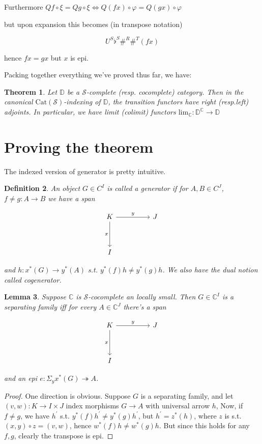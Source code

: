 \documentclass[10pt, oneside]{article}
\newtheorem{theorem}{Theorem}[section]
\newtheorem{definition}[theorem]{Definition}
\newtheorem{lemma}[theorem]{Lemma}
\begin{document}
Furthermore $Q f \circ \xi = Q g \circ \xi \iff Q (f x) \circ \varphi = Q (g x) \circ \varphi$

\noindent but upon expansion this becomes (in transpose notation)

$$U^S \flat^S \#^R \#^T (fx)$$

\noindent hence $fx = gx$ but $x$ is epi.

Packing together everything we've proved thus far, we have:

\begin{theorem}
    Let $\mathbb{D}$ be a $\mathcal{S}$-complete (resp. cocomplete) category. Then in the canonical $\mathrm{Cat}{(\mathcal{S})}$-indexing of $\mathbb{D}$, the transition functors have right (resp.left) adjoints. In particular, we have limit (colimit) functors $\mathrm{lim}_{\mathbb{C}}: \mathbb{D}^\mathbb{C} \to \mathbb{D}$
\end{theorem}

\section{Proving the theorem}

The indexed version of generator is pretty intuitive.
\begin{definition}
    An object $G \in C^I$ is called a generator if for $A, B \in C^J$, $f \neq g: A \to B$ we have a span

    \[\begin{tikzcd}
	K && J \\
	\\
	I
	\arrow["x"', from=1-1, to=3-1]
	\arrow["y", from=1-1, to=1-3]
    \end{tikzcd}\]
    
    \noindent and $h: x^\ast(G) \to y^\ast(A)$ s.t. $y^\ast(f) h \neq y^\ast(g) h$. We also have the dual notion called cogenerator.
    
\end{definition}

\begin{lemma}\label{thm:generator-epi-map}
    Suppose $\mathbb{C}$ is $\mathcal{S}$-cocomplete an locally small. Then $G \in \mathbb{C}^I$ is a separating family iff for every $A \in \mathbb{C}^J$ there's a span 

    
    \[\begin{tikzcd}
	K && J \\
	\\
	I
	\arrow["x"', from=1-1, to=3-1]
	\arrow["y", from=1-1, to=1-3]
    \end{tikzcd}\]

    \noindent and an epi $e: \Sigma_y x^\ast  (G) \twoheadrightarrow A$.
\end{lemma}
\begin{proof}
    One direction is obvious. Suppose $G$ is a separating family, and let $(v, w): K \to I \times J$ index morphisms $G \to A$ with universal arrow $h$, Now, if $f \neq g$, we have $h^\prime$ s.t. $y^\ast (f) h^\prime \neq y^\ast (g) h^\prime$, but $h^\prime = z^\ast (h)$, where $z$ is s.t. $(x,y) \circ z = (v, w)$, hence $w^\ast (f) h \neq w^\ast (g) h$. But since this holds for any $f, g$, clearly the transpose is epi.
\end{proof}
\end{document}
